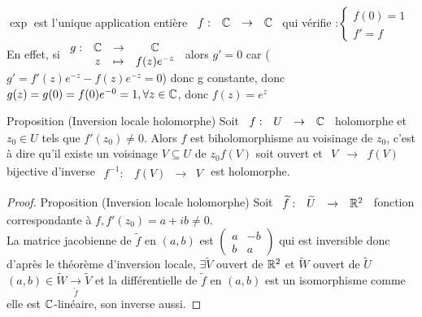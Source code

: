 \documentclass[]{report}
\begin{document}
\begin{re}{}{}
    $\exp$ est l'unique application entière $\begin{array}{ccccc}
f : & \mathbb{C} & \to & \mathbb{C}
\end{array}$ qui vérifie :$\begin{cases}
    f(0)=1\\
    f'=f
\end{cases}$\\
En effet, si $\begin{array}{ccccc}
g : & \mathbb{C} & \to & \mathbb{C} \\
  & z & \mapsto & f(z)e^{-z}
\end{array}$ alors $g'=0$ car ($g'=f'(z)e^{-z}-f(z)e^{-z}=0$) donc g constante, donc $g(z)=g(0)=f(0)e^{-0}=1,\forall z \in \mathbb{C}$, donc $f(z)=e^z$
\end{re}

\begin{prop}{Proposition (Inversion locale holomorphe)}{}
    Soit $\begin{array}{ccccc}
f : & U & \to & \mathbb{C}
\end{array}$ holomorphe et $z_0\in U$ tels que $f'(z_0)\neq 0$. Alors $f$ est biholomorphisme au voisinage de $z_0$, c'est à dire qu'il existe un voisinage $V\subseteq U$ de $z_0$\tq $f(V)$ soit ouvert et $\begin{array}{ccccc}
V & \to & f(V)
\end{array}$ bijective d'inverse $\begin{array}{ccccc}
f^{-1} : & f(V) & \to & V
\end{array}$ est holomorphe.
\end{prop}

\begin{proof}{Proposition (Inversion locale holomorphe)}{}
    Soit $\begin{array}{ccccc}
\widetilde{f} : & \widetilde{U} & \to & \mathbb{R}^2
\end{array}$ fonction correspondante à $f, f'(z_0)=a+ib\neq 0$.\\
La matrice jacobienne de $\widetilde{f}$ en $(a,b)$ est $\begin{pmatrix}
a & -b \\
b & a
\end{pmatrix}$ qui est inversible donc d'après le théorème d'inversion locale, $\exists \widetilde{V}$ ouvert de $\mathbb{R}^2$ et $\widetilde{W}$ ouvert de $\widetilde{U}$ \tq $(a,b)\in \widetilde{W}\underset{\widetilde{f}}{\longrightarrow} \widetilde{V}$ et la différentielle de $\widetilde{f}$ en $(a,b)$ est un isomorphisme comme elle est $\mathbb{C}$-linéaire, son inverse aussi.
\end{proof}
\end{document}
